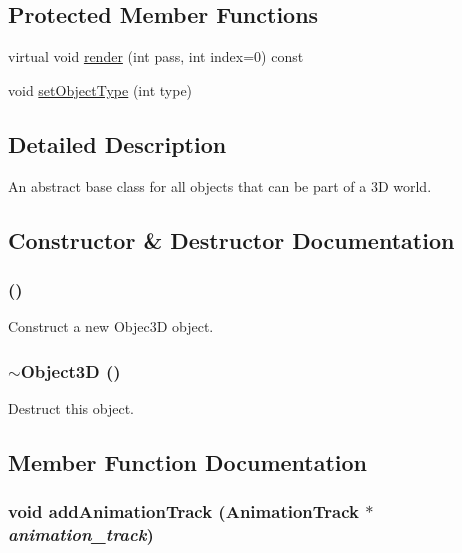 \subsection*{Protected Member Functions}
\begin{CompactItemize}
\item 
virtual void \hyperlink{classm3g_1_1Object3D_1efcb1973989d9963d5bd6d03065d389}{render} (int pass, int index=0) const 
\item 
void \hyperlink{classm3g_1_1Object3D_777701a101d1332abffa2ad6a255b91d}{setObjectType} (int type)
\end{CompactItemize}


\subsection{Detailed Description}
An abstract base class for all objects that can be part of a 3D world. 

\subsection{Constructor \& Destructor Documentation}
\hypertarget{classm3g_1_1Object3D_f4b10c33b9014a3f0a675ef4b699b773}{
\subsubsection[{Object3D}]{ ()}}
\label{classm3g_1_1Object3D_f4b10c33b9014a3f0a675ef4b699b773}


Construct a new Objec3D object. \hypertarget{classm3g_1_1Object3D_8ece10725587e63a2c75283c16cc4df5}{
\subsubsection[{$\sim$Object3D}]{\setlength{\rightskip}{0pt plus 5cm}$\sim${\bf Object3D} ()}}
\label{classm3g_1_1Object3D_8ece10725587e63a2c75283c16cc4df5}


Destruct this object. 

\subsection{Member Function Documentation}
\hypertarget{classm3g_1_1Object3D_415c0b110f95410ded9b85e5d99a496b}{
\subsubsection[{addAnimationTrack}]{\setlength{\rightskip}{0pt plus 5cm}void addAnimationTrack ({\bf AnimationTrack} $\ast$ {\em animation\_\-track})}}
\label{classm3g_1_1Object3D_415c0b110f95410ded9b85e5d99a496b}


